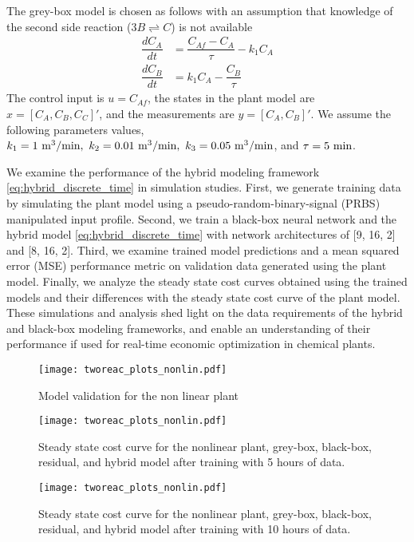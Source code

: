 \documentclass{article}
\begin{document}
The grey-box model is chosen as follows with an assumption that knowledge of the
second side reaction ($3B \rightleftharpoons C $) is not available
\begin{align*}
  \dfrac{dC_A}{dt} &= \dfrac{C_{Af} - C_A}{\tau} - k_1C_A\\
  \dfrac{dC_B}{dt} &= k_1C_A - \dfrac{C_B}{\tau}
\end{align*}
The control input is $u = C_{Af}$, the states in the plant model are $x = [C_A,
C_B, C_C]'$, and the measurements are $y = [C_A, C_B]'$. We assume the following
parameters values, $k_1 = 1 \ \textnormal{m}^3/\textnormal{min}, \ k_2 = 0.01 \
\textnormal{m}^3/\textnormal{min}, \ k_3 = 0.05 \
\textnormal{m}^3/\textnormal{min}$, and $\tau = 5 \ \textnormal{min}$.

We examine the performance of the hybrid modeling framework
\eqref{eq:hybrid_discrete_time} in simulation studies. First, we generate
training data by simulating the plant model using a pseudo-random-binary-signal
(PRBS) manipulated input profile. Second, we train a black-box neural network
and the hybrid model \eqref{eq:hybrid_discrete_time} with network architectures
of [9, 16, 2] and [8, 16, 2]. Third, we examine trained model predictions and a
mean squared error (MSE) performance metric on validation data generated using
the plant model. Finally, we analyze the steady state cost curves obtained using
the trained models and their differences with the steady state cost 
curve of the plant model. These
simulations and analysis shed light on the data requirements of the hybrid and black-box
modeling frameworks, and enable an understanding of their performance if used
for real-time economic optimization in chemical plants.

\begin{figure}[!h]
  \centering
  \texttt{[image: tworeac\_plots\_nonlin.pdf]}
  \caption{Model validation for the non linear plant}
  \label{fig:validation_nonlinear}
\end{figure}

\begin{figure}[!h]
  \centering
  \texttt{[image: tworeac\_plots\_nonlin.pdf]}
  \caption{Steady state cost curve for the nonlinear plant, grey-box, black-box,
  residual, and hybrid model after training with 5 hours of data.}
  \label{fig:cost_nonlinear_5hours}
\end{figure}

\begin{figure}[!h]
  \centering
  \texttt{[image: tworeac\_plots\_nonlin.pdf]}
  \caption{Steady state cost curve for the nonlinear plant, grey-box, black-box,
  residual, and hybrid model after training with 10 hours of data.}
  \label{fig:cost_nonlinear_10hours}
\end{figure}

\end{document}
